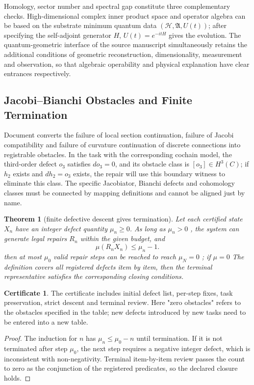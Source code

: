 \documentclass[11pt,a4paper]{article}
\theoremstyle{plain}
\newtheorem{theorem}{Theorem}[section]
\theoremstyle{definition}
\newtheorem*{certificate}{Certificate}
\theoremstyle{remark}
\begin{document}
\begin{CJK*}
Homology, sector number and spectral gap constitute three complementary checks. High-dimensional complex inner product space and operator algebra can be based on the substrate minimum quantum data $(\mathcal H,\mathfrak A,U(t))$; after specifying the self-adjoint generator $H$, $U(t)=e^{-itH}$ gives the evolution. The quantum-geometric interface of the source manuscript simultaneously retains the additional conditions of geometric reconstruction, dimensionality, measurement and observation, so that algebraic operability and physical explanation have clear entrances respectively.

\subsection { Jacobi--Bianchi Obstacles and Finite Termination }

Document \cite{S23,S24} converts the failure of local section continuation, failure of Jacobi compatibility and failure of curvature continuation of discrete connections into registrable obstacles. In the task with the corresponding cochain model, the third-order defect $o_3$ satisfies $do_3=0$, and its obstacle class is $[o_3]\in H^3(C)$; if $h_2$ exists and $dh_2=o_3$ exists, the repair will use this boundary witness to eliminate this class. The specific Jacobiator, Bianchi defects and cohomology classes must be connected by mapping definitions and cannot be aligned just by name.

\begin{theorem}
[finite defective descent gives termination]\label{ss:termination}
Let each certified state $X_n$ have an integer defect quantity $\mu_n\ge0$. As long as $\mu_n>0$ , the system can generate legal repairs $R_n$ within the given budget, and \[
 \mu(R_nX_n)\le\mu_n-1.
\] then at most $\mu_0$ valid repair steps can be reached to reach $\mu_N=0$ ; if $\mu=0$ The definition covers all registered defects item by item, then the terminal representative satisfies the corresponding closing conditions.\end{theorem}
\begin{certificate}
The certificate includes initial defect list, per-step fixes, task preservation, strict descent and terminal review. Here "zero obstacles" refers to the obstacles specified in the table; new defects introduced by new tasks need to be entered into a new table.\end{certificate}
\begin{proof}
The induction for $n$ has $\mu_n\le\mu_0-n$ until termination. If it is not terminated after step $\mu_0$, the next step requires a negative integer defect, which is inconsistent with non-negativity. Terminal item-by-item review passes the count to zero as the conjunction of the registered predicates, so the declared closure holds.\end{proof}



\end{CJK*}
\end{document}
